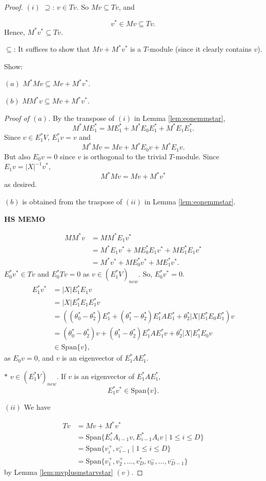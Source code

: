 \documentclass[
]{book}
\theoremstyle{definition}
\theoremstyle{definition}
\theoremstyle{definition}
\theoremstyle{definition}
\theoremstyle{remark}
\begin{document}
\begin{proof}
\leavevmode

\((i)\) \(\supseteq\): \(v\in Tv\). So \(Mv \subseteq Tv\), and

\[v^* \in Mv \subseteq Tv.\]
Hence, \(M^*v^* \subseteq Tv\).

\(\subseteq\): It suffices to show that \(Mv + M^*v^*\) is a \(T\)-module (since it clearly contains \(v\)).

Show:

\((a)\) \(M^*Mv \subseteq Mv + M^*v^*\).

\((b)\) \(MM^*v \subseteq Mv + M^*v^*\).

\emph{Proof of \((a)\).}
By the transpose of \((i)\) in Lemma \ref{lem:eonemmstar},
\[M^*ME^*_1 = ME^*_1 + M^*E_0E^*_1 + M^*E_1E^*_1.\]
Since \(v\in E^*_1V\), \(E^*_1v = v\) and
\[M^*Mv = Mv + M^*E_0v + M^*E_1v.\]
But also \(E_0v = 0\) since \(v\) is orthogonal to the trivial \(T\)-module.
Since \(E_1v = |X|^{-1}v^*\),
\[M^*Mv = Mv + M^*v^*\]
as desired.

\((b)\) is obtained from the traspose of \((ii)\) in Lemma \ref{lem:eonemmstar}.

\textbf{HS MEMO}

\begin{align}
MM^*v & = MM^*E_1v^*\\
& = M^*E_1v^* + ME^*_0E_1v^* + ME^*_1E_1v^*\\
& = M^*v^* + ME^*_0v^* + ME^*_1v^*.
\end{align}
\(E^*_0v^*\in Tv\) and \(E^*_0Tv = 0\) as \(v\in (E^*_1V)_{new}\). So, \(E^*_0v^* = 0\).
\begin{align}
E^*_1v^* & = |X|E^*_1E_1v \\
& = |X|E^*_1E_1E^*_1v\\
& = ((\theta^*_0-\theta^*_2)E^*_1 + (\theta^*_1-\theta^*_2)E^*_1AE^*_1 + \theta^*_2|X|E^*_1E_0E^*_1)v\\
& = (\theta^*_0-\theta^*_2)v + (\theta^*_1-\theta^*_2)E^*_1AE^*_1v + \theta^*_2|X|E^*_1E_0v\\
& \in \mathrm{Span}\{v\},
\end{align}
as \(E_0v = 0\), and \(v\) is an eigenvector of \(E^*_1AE^*_1\).

\(\ast\) \(v\in (E^*_1V)_{new}\). If \(v\) is an eigenvector of \(E^*_1AE^*_1\),
\[E^*_1v^* \in \mathrm{Span}\{v\}.\]

\((ii)\) We have

\begin{align}
Tv & = Mv + M^*v^*\\
& = \mathrm{Span}\{E^*_iA_{i-1}v, E^*_{i-1}A_iv\mid 1\leq i\leq D\}\\
& = \mathrm{Span}\{v^+_i, v^-_{i-1}\mid 1\leq i\leq D\}\\
& = \mathrm{Span}\{v^+_1, v^+_2, \ldots, v^*_D, v_0^-, \ldots, v^-_{D-1}\}
\end{align}
by Lemma \ref{lem:mvplusmstarvstar} \((v)\).


\end{proof}
\end{document}
